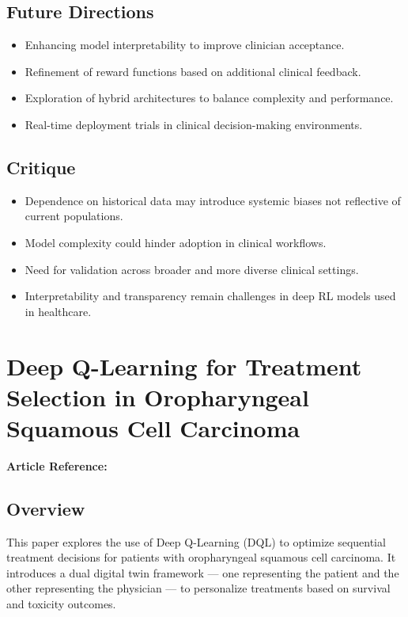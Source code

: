 \subsection*{Future Directions}
\begin{itemize}
    \item Enhancing model interpretability to improve clinician acceptance.
    \item Refinement of reward functions based on additional clinical feedback.
    \item Exploration of hybrid architectures to balance complexity and performance.
    \item Real-time deployment trials in clinical decision-making environments.
\end{itemize}

\subsection*{Critique}
\begin{itemize}
    \item Dependence on historical data may introduce systemic biases not reflective of current populations.
    \item Model complexity could hinder adoption in clinical workflows.
    \item Need for validation across broader and more diverse clinical settings.
    \item Interpretability and transparency remain challenges in deep RL models used in healthcare.
\end{itemize}
\section{Deep Q-Learning for Treatment Selection in Oropharyngeal Squamous Cell Carcinoma}
\textbf{Article Reference:} \cite{article_17}

\subsection*{Overview}
This paper explores the use of Deep Q-Learning (DQL) to optimize sequential treatment decisions for patients with oropharyngeal squamous cell carcinoma. It introduces a dual digital twin framework — one representing the patient and the other representing the physician — to personalize treatments based on survival and toxicity outcomes.

